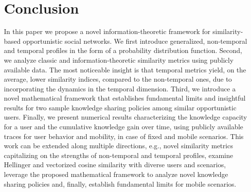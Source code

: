 \documentclass[conference]{IEEEtran}
\theoremstyle{definition}
\begin{document}
\section{Conclusion}
\vspace{-0.3 cm}
In this paper we propose a novel information-theoretic framework 
for similarity-based opportunistic social networks.
We first introduce generalized, non-temporal 
and temporal profiles in the form of a probability 
distribution function. Second, we analyze classic and information-theoretic
similarity metrics using publicly available data. The most noticeable 
insight is that temporal metrics yield, on the average, lower similarity 
indices, compared to the non-temporal ones, due to incorporating 
the dynamics in the temporal dimension. Third, we introduce a novel 
mathematical framework that establishes fundamental limits and insightful 
results for two sample knowledge sharing policies among similar opportunistic users. 
Finally, we present numerical results characterizing the knowledge capacity for a 
user and the cumulative knowledge gain over time, using publicly 
available traces for user behavior and mobility, in case of fixed and mobile
scenarios. This work can be extended along multiple directions, e.g., novel 
similarity metrics capitalizing on the strengths of non-temporal and temporal 
profiles, examine Hellinger and vectorized cosine similarity with diverse users 
and scenarios, leverage the proposed mathematical framework to analyze
novel knowledge sharing policies and, finally, establish fundamental limits for 
mobile scenarios. 

%
%
\vspace{-0.6 cm}
{\footnotesize {


}}
\end{document}

